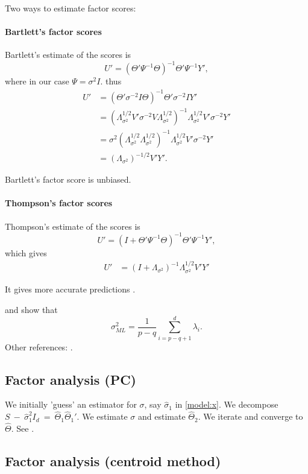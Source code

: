 \documentclass{article}
\begin{document}
Two ways to estimate factor scores:

\paragraph{Bartlett's factor scores}
Bartlett's estimate of the scores is
\[
U' = (\Theta' \Psi^{-1} \Theta)^{-1} \Theta'\Psi^{-1} Y',
\]
where in our case $\Psi = \sigma^2 I$. thus
\begin{align*}
U' &= (\Theta' \sigma^{-2} I \Theta)^{-1} \Theta'\sigma^{-2} I Y'\\
&= (\Lambda_{\sigma^2}^{1/2}V' \sigma^{-2} V\Lambda_{\sigma^2}^{1/2})^{-1} \Lambda_{\sigma^2}^{1/2}V' \sigma^{-2} Y'\\
&= \sigma^{2}(\Lambda_{\sigma^2}^{1/2} \Lambda_{\sigma^2}^{1/2})^{-1} \Lambda_{\sigma^2}^{1/2}V' \sigma^{-2} Y'\\
&= (\Lambda_{\sigma^2})^{-1/2}V' Y'.
\end{align*}

Bartlett's factor score is unbiased.

\paragraph{Thompson's factor scores}
Thompson's estimate of the scores is
\[
U' = (I + \Theta' \Psi^{-1} \Theta)^{-1} \Theta'\Psi^{-1} Y',
\]
which gives
\begin{align*}
U' &= (I + \Lambda_{\sigma^2})^{-1} \Lambda_{\sigma^2}^{1/2}V' Y'
\end{align*}

It gives more accurate predictions \citet{paterek2007improving}.

\citet{krzanowski1995multivariate} and \citet{tipping1999probabilistic} show that
\[
\sigma_{ML}^2 = \frac{1}{p-q} \sum_{i = p-q+1}^d\lambda_i.
\]
Other references: \citet{rubin1982algorithms}.



\subsection{Factor analysis (PC)}

We initially 'guess' an estimator for $\sigma$, say $\hat\sigma_1$ in \eqref{model:x}. We decompose $S~-~\hat\sigma_1^2I_d~=~\hat\Theta_1 \hat\Theta_1'$. We estimate $\sigma$ and estimate $\hat\Theta_2$. We iterate and converge to $\hat\Theta$. See \citet{lawley1971factor}.

\subsection{Factor analysis (centroid method)}
 \citet{lawley1971factor}
\end{document}
